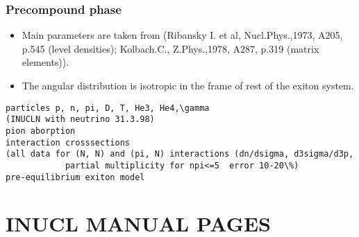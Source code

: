 
\subsubsection{Precompound phase}
\begin{itemize}

\item Main parameters are taken from (Ribansky I. et al, Nucl.Phys.,1973, A205, p.545 (level densities); Kolbach.C., Z.Phys.,1978, A287, p.319 (matrix elements)). 
\item The angular distribution is isotropic in the frame of rest of the exiton system.
\end{itemize}



\begin{verbatim}
particles p, n, pi, D, T, He3, He4,\gamma
(INUCLN with neutrino 31.3.98)
pion aborption
interaction crosssections
(all data for (N, N) and (pi, N) interactions (dn/dsigma, d3sigma/d3p, 
            partial multiplicity for npi<=5  error 10-20\%)
pre-equilibrium exiton model 
\end{verbatim}

\section{INUCL MANUAL PAGES}

